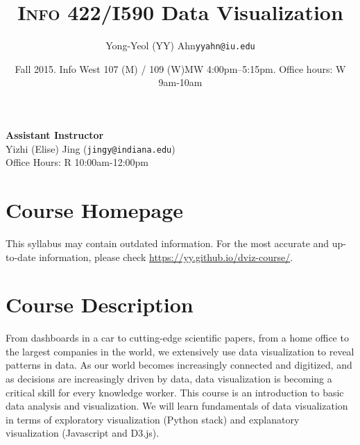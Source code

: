 \documentclass[11pt,article,oneside]{memoir}
\makeatletter
\def\myauthor{Author}
\def\mytitle{Title}
\def\myemail{yyahn@iu.edu}
\def\myauthor{Yong-Yeol (YY) Ahn}
\def\mytitle{{\normalsize \textsc{Info} 422/I590 \newline} \HUGE Data Visualization}
\makeatother
\begin{document}

\def\ind{\hangindent=1 true cm\hangafter=1 \noindent}
\def\labelitemi{$\cdot$}


\title{\LARGE \mytitle}     
\author{\Large\myauthor \newline \footnotesize\texttt{\noindent\myemail}}
\date{Fall 2015. Info West 107 (M) / 109 (W)\newline MW 4:00pm--5:15pm. \newline Office hours: W 9am-10am}

\maketitle

\vspace{-20pt}
{\bfseries Assistant Instructor} \\ Yizhi (Elise) Jing (\texttt{jingy@indiana.edu}) \\ Office Hours: R 10:00am-12:00pm 

\section{Course Homepage}

This syllabus may contain outdated information. For the most accurate and up-to-date information, 
please check \url{https://yy.github.io/dviz-course/}. 

\section{Course Description}

From dashboards in a car to cutting-edge scientific papers, from a home office
to the largest companies in the world, we extensively use data visualization to
reveal patterns in data. As our world becomes increasingly connected and
digitized, and as decisions are increasingly driven by data, data visualization
is becoming a critical skill for every knowledge worker. This course is an
introduction to basic data analysis and visualization. We will learn
fundamentals of data visualization in terms of exploratory visualization
(Python stack) and explanatory visualization (Javascript and D3.js).  
\end{document}
